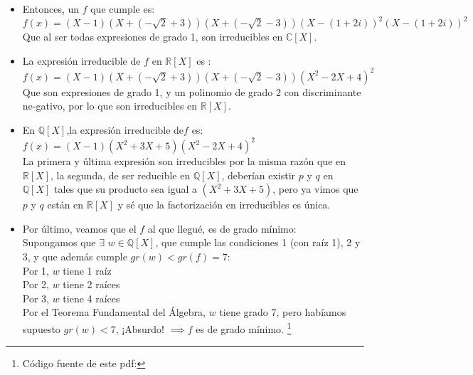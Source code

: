 \documentclass[12pt,twoside,a4paper]{exam}
\begin{document}
\begin{itemize}
      \item Entonces, un $f$ que cumple es: \\
            $f(x)=(X-1)(X+(-\sqrt{2}+3))(X+(-\sqrt{2}-3))(X-(1+2i))^2(X-(1+2i))^2$\\
            Que al ser todas expresiones de grado 1, son irreducibles en $\mathbb{C}[X]$.\\
      \item La expresión irreducible de $f$ en  $\mathbb{R}[X]$ es : \\
            $f(x)=(X-1)(X+(-\sqrt{2}+3))(X+(-\sqrt{2}-3))(X^2-2X+4)^2$\\
            Que son expresiones de grado 1, y un polinomio de grado 2
            con discriminante ne-gativo, por lo que son irreducibles en $\mathbb{R}[X]$.\\
      \item En $\mathbb{Q}[X]$,la expresión irreducible de$f$ es:\\
            $f(x)=(X-1)(X^2+3X+5)(X^2-2X+4)^2$\\
            La primera y última expresión son irreducibles por la misma razón que en 
            $\mathbb{R}[X]$, la segunda, de ser reducible en $\mathbb{Q}[X]$, deberían
            existir $p$ y $q$ en $\mathbb{Q}[X]$ tales que su producto sea igual
            a $(X^2+3X+5)$, pero ya vimos que  $p$ y $q$ están en $\mathbb{R}[X]$
            y sé que la factorización en irreducibles es única.
      \item Por último, veamos que el $f$ al que llegué, es de grado mínimo:\\
            Supongamos que $\exists$ $w \in \mathbb{Q}[X]$, que cumple las condiciones
            1 (con raíz 1), 2 y 3, y que además cumple $gr(w)<gr(f)=7$:\\
            Por 1, $w$ tiene 1 raíz \\
            Por 2, $w$ tiene 2 raíces \\
            Por 3, $w$ tiene 4 raíces \\
            Por el Teorema Fundamental del Álgebra, $w$ tiene grado 7, pero
            habíamos supuesto $gr(w) < 7 $, ¡Absurdo! $\implies f$ es de grado mínimo.
            \footnote{Código fuente de este pdf:} 
\end{itemize}
\end{document}
